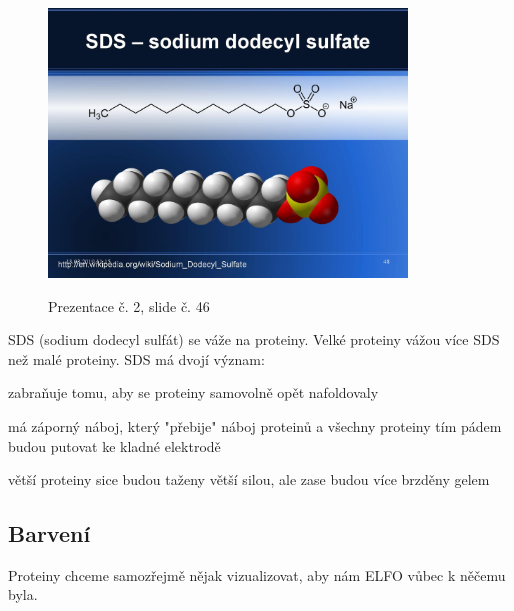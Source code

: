 \documentclass[DIV=8]{scrreprt}
\begin{document}
\begin{figure}
    \caption{Prezentace č. 2, slide č. 46}
    \includegraphics[width=0.85\textwidth]{slides-2/slide-46.jpg}
    \centering
    \label{slides-2-slide-46}
\end{figure}

SDS (sodium dodecyl sulfát) se váže na proteiny. Velké proteiny vážou více SDS než malé proteiny. SDS má dvojí význam:
\begin{myEnumerate}[nosep]
    \item zabraňuje tomu, aby se proteiny samovolně opět nafoldovaly
    \item má záporný náboj, který "přebije" náboj proteinů a všechny proteiny tím pádem budou putovat ke kladné elektrodě
\begin{myItemize}[nosep]
    \item větší proteiny sice budou taženy větší silou, ale zase budou více brzděny gelem
\end{myItemize}

\end{myEnumerate}



\subsection{Barvení} \label{Barvení}


Proteiny chceme samozřejmě nějak vizualizovat, aby nám ELFO vůbec k něčemu byla.
\end{document}
